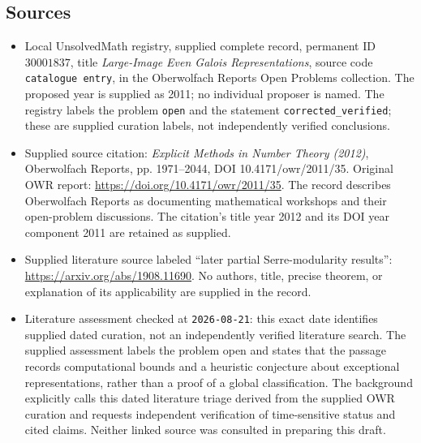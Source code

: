 \documentclass[11pt]{article}
\begin{document}
\subsection{Sources}
\begin{itemize}
\item Local UnsolvedMath registry, supplied complete record, permanent ID \(30001837\), title \emph{Large-Image Even Galois Representations}, source code \texttt{catalogue entry}, in the Oberwolfach Reports Open Problems collection. The proposed year is supplied as 2011; no individual proposer is named. The registry labels the problem \texttt{open} and the statement \texttt{corrected\_verified}; these are supplied curation labels, not independently verified conclusions.
\item Supplied source citation: \emph{Explicit Methods in Number Theory (2012)}, Oberwolfach Reports, pp. 1971--2044, DOI 10.4171/owr/2011/35. Original OWR report: \url{https://doi.org/10.4171/owr/2011/35}. The record describes Oberwolfach Reports as documenting mathematical workshops and their open-problem discussions. The citation's title year 2012 and its DOI year component 2011 are retained as supplied.
\item Supplied literature source labeled ``later partial Serre-modularity results'': \url{https://arxiv.org/abs/1908.11690}. No authors, title, precise theorem, or explanation of its applicability are supplied in the record.
\item Literature assessment checked at \texttt{2026-08-21}: this exact date identifies supplied dated curation, not an independently verified literature search. The supplied assessment labels the problem open and states that the passage records computational bounds and a heuristic conjecture about exceptional representations, rather than a proof of a global classification. The background explicitly calls this dated literature triage derived from the supplied OWR curation and requests independent verification of time-sensitive status and cited claims. Neither linked source was consulted in preparing this draft.
\end{itemize}
\end{document}
